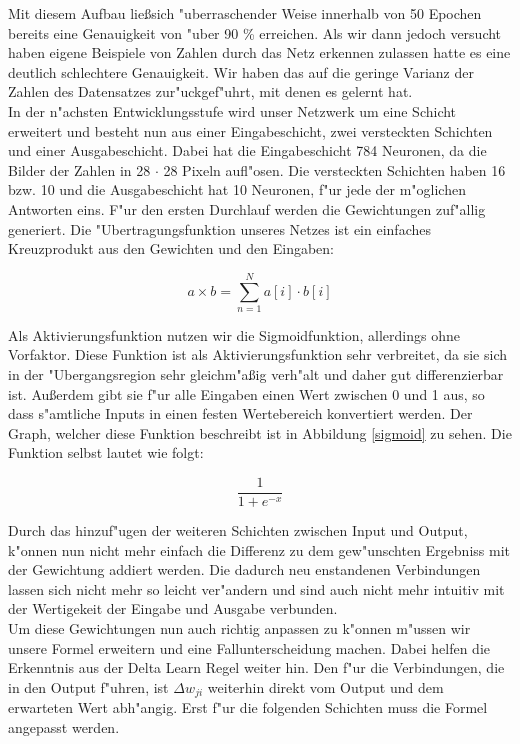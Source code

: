 \documentclass[12pt,a4paper]{scrartcl}
\begin{document}
Mit diesem Aufbau lie\ss sich "uberraschender Weise innerhalb von 50 Epochen bereits eine Genauigkeit von "uber 90 \% erreichen. Als wir dann jedoch versucht haben eigene Beispiele von Zahlen durch das Netz erkennen zulassen hatte es eine deutlich schlechtere Genauigkeit. Wir haben das auf die geringe Varianz der Zahlen des Datensatzes zur"uckgef"uhrt, mit denen es gelernt hat. \\

In der n"achsten Entwicklungsstufe wird unser Netzwerk um eine Schicht erweitert und besteht nun aus einer Eingabeschicht, zwei versteckten Schichten und einer Ausgabeschicht. Dabei hat die Eingabeschicht 784 Neuronen, da die Bilder der Zahlen in 28 $\cdot$ 28 Pixeln aufl"osen. Die versteckten Schichten haben 16 bzw. 10 und die Ausgabeschicht hat 10 Neuronen, f"ur jede der m"oglichen Antworten eins. F"ur den ersten Durchlauf werden die Gewichtungen zuf"allig generiert. Die "Ubertragungsfunktion unseres Netzes ist ein einfaches Kreuzprodukt aus den Gewichten und den Eingaben:

$$ a \times b = 	\sum_{n=1}^{N} a[i] \cdot b[i] $$

Als Aktivierungsfunktion nutzen wir die Sigmoidfunktion, allerdings ohne Vorfaktor. Diese Funktion ist als Aktivierungsfunktion sehr verbreitet, da sie sich in der "Ubergangsregion sehr gleichm"a\ss ig verh"alt und daher gut differenzierbar ist. Au\ss erdem gibt sie f"ur alle Eingaben einen Wert zwischen 0 und 1 aus, so dass s"amtliche Inputs in einen festen Wertebereich konvertiert werden. Der Graph, welcher diese Funktion beschreibt ist in Abbildung \ref{sigmoid} zu sehen. Die Funktion selbst lautet wie folgt:

$$ \frac{1}{1+e^{-x}}$$	

Durch das hinzuf"ugen der weiteren Schichten zwischen Input und Output, k"onnen nun nicht mehr einfach die Differenz zu dem gew"unschten Ergebniss mit der Gewichtung addiert werden. Die dadurch neu enstandenen Verbindungen lassen sich nicht mehr so leicht ver"andern und sind auch nicht mehr intuitiv mit der Wertigekeit der Eingabe und Ausgabe verbunden.\\

Um diese Gewichtungen nun auch richtig anpassen zu k"onnen m"ussen wir unsere Formel erweitern und eine Fallunterscheidung machen. Dabei helfen die Erkenntnis aus der Delta Learn Regel weiter hin. Den f"ur die Verbindungen, die in den Output f"uhren, ist $\Delta w_{ji}$ weiterhin direkt vom Output und dem erwarteten Wert abh"angig. Erst f"ur die folgenden Schichten muss die Formel angepasst werden. \\
\end{document}
